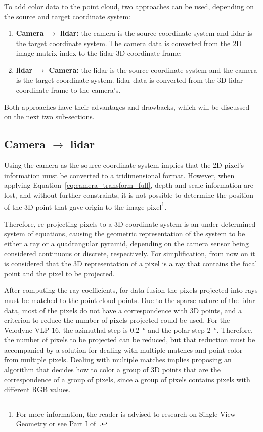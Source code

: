 To add color data to the point cloud, two approaches can be used, depending on the source and target coordinate system:

\begin{enumerate} 
	\item \textbf{Camera $\rightarrow$ \ac{lidar}:} the camera is the source coordinate system and \ac{lidar} is the target coordinate system. The camera data is converted from the 2D image  matrix index to the \ac{lidar} 3D coordinate frame;
	\item \textbf{\ac{lidar} $\rightarrow$ Camera:} the \ac{lidar} is the source coordinate system and the camera is the target coordinate system. \ac{lidar} data is converted from the 3D \ac{lidar} coordinate frame to the camera's.
\end{enumerate}

Both approaches have their advantages and drawbacks, which will be discussed on the next two sub-sections.

\subsection{Camera $\rightarrow$ \ac{lidar}} 
Using the camera as the source coordinate system implies that the 2D pixel's information must be converted to a tridimensional format. However, when applying Equation~\eqref{eq:camera_transform_full}, depth and scale information are lost, and without further constraints, it is not possible to determine the position of the 3D point that gave origin to the image pixel\footnote{For more information, the reader is advised to research on Single View Geometry or see Part I of~\cite{mvg_book}.}. 

Therefore, re-projecting pixels to a 3D coordinate system is an under-determined system of equations, causing the geometric representation of the system to be either a ray or a quadrangular pyramid, depending on the camera sensor being considered continuous or discrete, respectively. For simplification, from now on it is considered that the 3D representation of a pixel is a ray that contains the focal point and the pixel to be projected.

After computing the ray coefficients, for data fusion the pixels projected into rays must be matched to the point cloud points. Due to the sparse nature of the \ac{lidar} data, most of the pixels do not have a correspondence with 3D points, and a criterion to reduce the number of pixels projected could be used. For the Velodyne VLP-16, the azimuthal step is \SI{0.2}{\degree} and the polar step \SI{2}{\degree}. Therefore, the number of pixels to be projected can be reduced, but that reduction must be accompanied by a solution for dealing with multiple matches and point color from multiple pixels. Dealing with multiple matches implies proposing an algorithm that decides  how to color a group of 3D points that are the correspondence of a group of pixels, since a group of pixels contains pixels with different RGB values.

